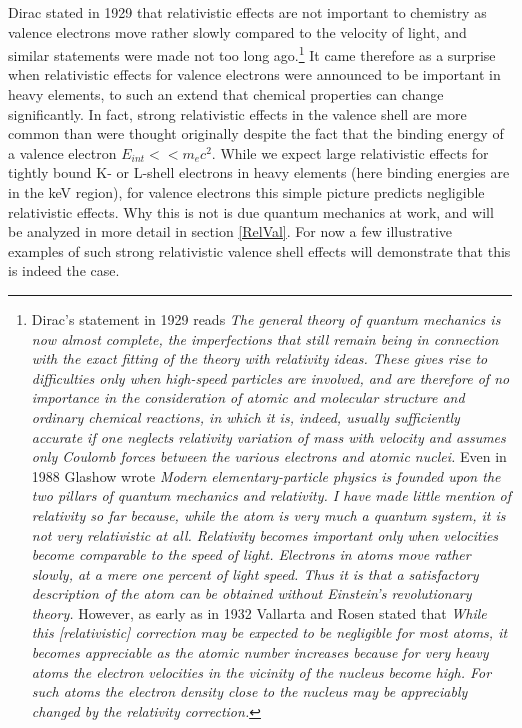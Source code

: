 \documentclass[12pt]{article}
\begin{document}
Dirac stated in 1929\cite{Dirac-1929} that relativistic effects are not important to chemistry as valence electrons move rather slowly compared to the velocity of light, and similar statements were made not too long ago.\footnote{Dirac's statement in 1929 reads\cite{Dirac-1929} {\it The general theory of quantum mechanics is now almost complete, the imperfections that still remain being in connection with the exact fitting of the theory with relativity ideas. These gives rise to difficulties only when high-speed particles are involved, and are therefore of no importance in the consideration of atomic and molecular structure and ordinary chemical reactions, in which it is, indeed, usually sufficiently accurate if one neglects relativity variation of mass with velocity and assumes only Coulomb forces between the various electrons and atomic nuclei.} Even in 1988 Glashow wrote\cite{glashow-1993} {\it Modern elementary-particle physics is founded upon the two pillars of quantum mechanics and relativity. I have made little mention of relativity so far because, while the atom is very much a quantum system, it is not very relativistic at all. Relativity becomes important only when velocities become comparable to the speed of light. Electrons in atoms move rather slowly, at a mere one percent of light speed. Thus it is that a satisfactory description of the atom can be obtained without Einstein's revolutionary theory.} However, as early as in 1932 Vallarta and Rosen stated that\cite{Vallarta-1932} {\it While this [relativistic] correction may be expected to be negligible for most atoms, it becomes appreciable as the atomic number increases because for very heavy atoms the electron velocities in the vicinity of the nucleus become high. For such atoms the electron density close to the nucleus may be appreciably changed by the relativity correction.}} 
It came therefore as a surprise when relativistic effects for valence electrons were announced to be important in heavy elements, to such an extend that chemical properties can change significantly.\cite{Desclaux-1973,Pyykko-1976, Pyykko-1976a, Pyykko-1977a,Pyykko-1977b,Pyykko-1979,Pitzer-1979,Pyykko-1988} 
In fact, strong relativistic effects in the valence shell are more common than were thought originally\cite{pyykko-2012relativistic} despite the fact that the binding energy of a valence electron $E_{int}<<m_ec^2$. While we expect large relativistic effects for tightly bound K- or L-shell electrons in heavy elements (here binding energies are in the keV region), for valence electrons this simple picture predicts negligible relativistic effects. Why this is not is due quantum mechanics at work, and will be analyzed in more detail in section \ref{RelVal}. For now a few illustrative examples of such strong relativistic valence shell effects will demonstrate that this is indeed the case.
\end{document}

